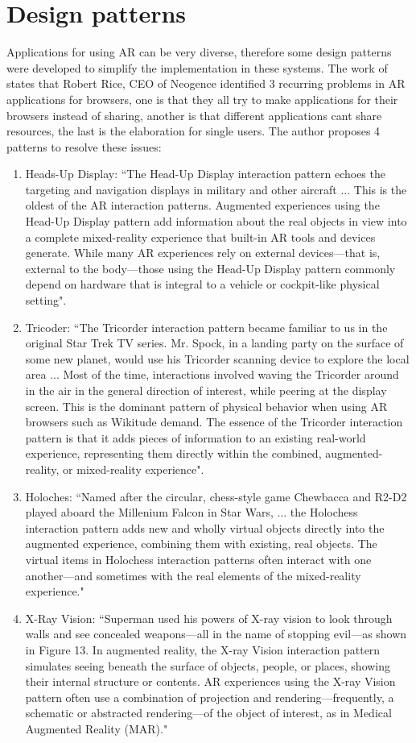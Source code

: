 \documentclass[a4paper,twoside]{article}
\begin{document}
\section{Design patterns}
Applications for using AR can be very diverse, therefore some design patterns were developed to simplify the implementation in these systems. The work of~\cite{InsideOu42} states that Robert Rice, CEO of Neogence identified 3 recurring problems in AR applications for browsers, one is that they all try to make applications for their browsers instead of sharing, another is that different applications cant share resources, the last is the elaboration for single users. The author proposes 4 patterns to resolve these issues:
\begin{enumerate}
\item Heads-Up Display: ``The Head-Up Display interaction pattern echoes the targeting and navigation displays in military and other aircraft ... This is the oldest of the AR interaction patterns. Augmented experiences using the Head-Up Display pattern add information about the real objects in view into a complete mixed-reality experience that built-in AR tools and devices generate. While many AR experiences rely on external devices—that is, external to the body—those using the Head-Up Display pattern commonly depend on hardware that is integral to a vehicle or cockpit-like physical setting".
\item Tricoder: ``The Tricorder interaction pattern became familiar to us in the original Star Trek TV series. Mr. Spock, in a landing party on the surface of some new planet, would use his Tricorder scanning device to explore the local area ... Most of the time, interactions involved waving the Tricorder around in the air in the general direction of interest, while peering at the display screen. This is the dominant pattern of physical behavior when using AR browsers such as Wikitude demand. The essence of the Tricorder interaction pattern is that it adds pieces of information to an existing real-world experience, representing them directly within the combined, augmented-reality, or mixed-reality experience".
\item Holoches: ``Named after the circular, chess-style game Chewbacca and R2-D2 played aboard the Millenium Falcon in Star Wars, ... the Holochess interaction pattern adds new and wholly virtual objects directly into the augmented experience, combining them with existing, real objects. The virtual items in Holochess interaction patterns often interact with one another—and sometimes with the real elements of the mixed-reality experience."
\item X-Ray Vision: ``Superman used his powers of X-ray vision to look through walls and see concealed weapons—all in the name of stopping evil—as shown in Figure 13. In augmented reality, the X-ray Vision interaction pattern simulates seeing beneath the surface of objects, people, or places, showing their internal structure or contents. AR experiences using the X-ray Vision pattern often use a combination of projection and rendering—frequently, a schematic or abstracted rendering—of the object of interest, as in Medical Augmented Reality (MAR)."
\end{enumerate}
\end{document}
